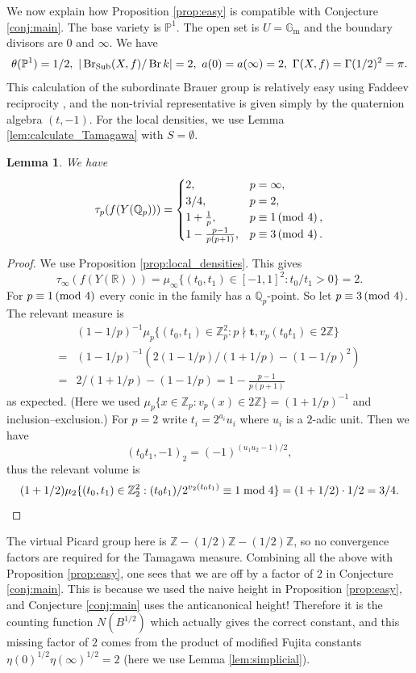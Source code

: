 \documentclass[a4paper,12pt,reqno]{amsart}
\numberwithin{equation}{section} \numberwithin{figure}{section}
\DeclareMathOperator{\vol}{vol} \DeclareMathOperator{\spn}{span}
\DeclareMathOperator{\Br}{Br} \DeclareMathOperator{\Brnr}{Br_{nr}}
\renewcommand\P{\mathbb{P}}
\newcommand\Z{\mathbb{Z}}
\newcommand\Q{\mathbb{Q}}
\newcommand\R{\mathbb{R}}
\newcommand\G{\mathbb{G}}
\newcommand\Gm{\G_\mathrm{m}}
\newcommand{\md}[1]{  \left(\textnormal{mod}\ #1\right)}
\renewcommand{\#}{\sharp}
\newtheorem{lemma}{Lemma}
\theoremstyle{definition}
\numberwithin{lemma}{section}
\begin{document}
We now explain how Proposition \ref{prop:easy} is compatible with Conjecture \ref{conj:main}. The  base variety is $\P^1$. The open set is $U = \Gm$ and the boundary divisors are $0$ and $\infty$. We have 
$$\theta(\P^1) = 1/2, \,\, |\Sub(X,f)/\Br k| = 2, \,\, a(0) =a(\infty) = 2,\,\, \Gamma(X,f) = \Gamma(1/2)^2 = \pi.$$
This calculation of the subordinate Brauer group is relatively easy using Faddeev reciprocity \cite[Thm.~1.5.2]{Brauer}, and the non-trivial representative is given simply by the quaternion algebra $(t,-1)$.
For the local densities, we use Lemma \ref{lem:calculate_Tamagawa} with $S = \emptyset$.

\begin{lemma}  
We have
	$$
	\tau_p(f(Y(\Q_p)))= 
	\begin{cases}
		2, & p = \infty,\\
		3/4, & p = 2, \\
		1 + \frac{1}{p}, &p \equiv 1 \md 4, \\
		1 - \frac{p-1}{p(p+1)}, & p \equiv 3 \md 4.
	\end{cases}$$
\end{lemma}
\begin{proof}
	We use Proposition \ref{prop:local_densities}. This gives 
	$$\tau_\infty(f(Y(\R))) = \mu_\infty\{ (t_0,t_1) \in [-1,1]^2 : t_0/t_1 > 0 \} = 2.$$
	For $p \equiv 1 \md 4$ every conic in the family has a $\Q_p$-point. So
	let $p \equiv 3 \md 4$. The relevant measure is 
\begin{align*}
&(1-1/p)^{-1}\mu_p\{ (t_0,t_1) \in \Z_p^2 : p \nmid \mathbf{t},  v_p(t_0t_1) \in 2 \Z\} \\
 = & (1-1/p)^{-1}(  2(1-1/p)/(1+1/p) - (1-1/p)^2) \\
 =  &2/(1+1/p) - (1-1/p)  
 =  1 - \frac{p-1}{p(p+1)} 
\end{align*}
as expected. (Here we used   $\mu_p\{ x \in \Z_p : v_p(x) \in 2\Z\} = (1+1/p)^{-1}$ and 
inclusion--exclusion.)
For $p=2$ write $t_i = 2^{a_i}u_i$ where $u_i$ is a $2$-adic unit. Then we have 
$$(t_0t_1,-1)_2 = (-1)^{{(u_1u_2 - 1)}/2}, $$ thus the relevant volume is
\begin{equation*}
(1+1/2)\mu_2\{ (t_0,t_1) \in \Z_2^2 : (t_0t_1)/2^{v_2(t_0t_1)} \equiv 1 \bmod 4\}
= (1 + 1/2) \cdot 1/2 = 3/4. \qedhere
\end{equation*}
\end{proof}

The virtual Picard group here is $\Z - (1/2)\Z - (1/2)\Z$, so no convergence factors are required for the Tamagawa measure. Combining all the above with Proposition \ref{prop:easy}, one sees that we are off by a factor of $2$ in Conjecture \ref{conj:main}. This is because we used the naive height in Proposition \ref{prop:easy}, and Conjecture \ref{conj:main} uses the anticanonical height! Therefore it is the counting function $N(B^{1/2})$ which actually gives the correct constant, and this missing factor of $2$ comes from the product of modified Fujita constants $\eta(0)^{1/2}\eta(\infty)^{1/2} = 2$ (here we use Lemma \ref{lem:simplicial}).
\end{document}
